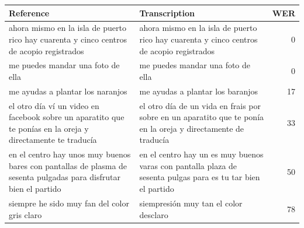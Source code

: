 \begin{tabular}{>{\raggedright\arraybackslash}p{}>{\raggedright\arraybackslash}p{}r}
\toprule
Reference & Transcription & WER \\
\midrule
ahora mismo en la isla de puerto rico hay cuarenta y cinco centros de acopio registrados & ahora mismo en la isla de puerto rico hay cuarenta y cinco centros de acopio registrados & 0 \\
me puedes mandar una foto de ella & me puedes mandar una foto de ella & 0 \\
me ayudas a plantar los naranjos & me ayudas a plantar los baranjos & 17 \\
el otro día ví un video en facebook sobre un aparatito que te ponías en la oreja y directamente te traducía & el otro día de un vida en frais por sobre en un aparatito que te ponía en la oreja y directamente de traducía & 33 \\
en el centro hay unos muy buenos bares con pantallas de plasma de sesenta pulgadas para disfrutar bien el partido & en el centro hay un es muy buenos varas con pantalla plaza de sesenta pulgas para es tu tar bien el partido & 50 \\
siempre he sido muy fan del color gris claro & siempresión muy tan el color desclaro & 78 \\
\bottomrule
\end{tabular}
